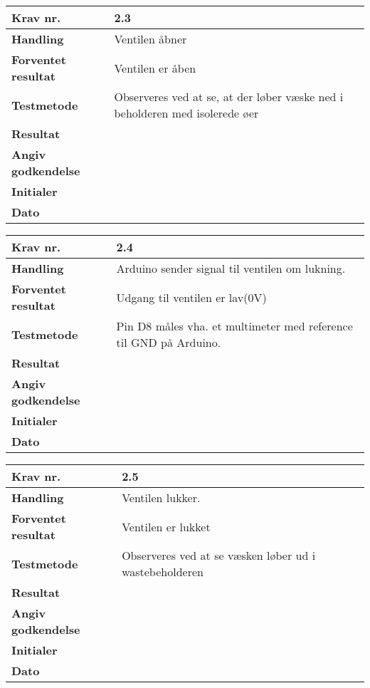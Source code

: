 	\begin{center}
		\begin{longtable}{ | m{4cm}| m{8.5cm}|} 
			\hline
			\textbf{Krav nr.} & 2.3  \\ 
			\hline
			\textbf{Handling} & Ventilen åbner   \\
			\hline
			\textbf{Forventet resultat} & Ventilen er åben \\
			\hline
			\textbf{Testmetode}  & Observeres ved at se, at der løber væske ned i beholderen med isolerede øer  \\
			\hline
			\textbf{Resultat}  &    \\
			\hline
			\textbf{Angiv godkendelse} &     \\
			\hline
			\textbf{Initialer} &     \\
			\hline
			\textbf{Dato} &    \\
			\hline
		\end{longtable}
	\end{center}
	
\newpage	
	
	\begin{center}
		\begin{longtable}{ | m{4cm}| m{8.5cm}|} 
			\hline
			\textbf{Krav nr.} & 2.4  \\ 
			\hline
			\textbf{Handling} & Arduino sender signal til ventilen om lukning.   \\
			\hline
			\textbf{Forventet resultat} & Udgang til ventilen er lav(0V) \\
			\hline
			\textbf{Testmetode}  & Pin D8 måles vha. et multimeter med reference til GND på Arduino.  \\
			\hline
			\textbf{Resultat}  &    \\
			\hline
			\textbf{Angiv godkendelse} &     \\
			\hline
			\textbf{Initialer} &     \\
			\hline
			\textbf{Dato} &    \\
			\hline
		\end{longtable}
	\end{center}	
	
	\begin{center}
		\begin{longtable}{ | m{4cm}| m{8.5cm}|} 
			\hline
			\textbf{Krav nr.} & 2.5  \\ 
			\hline
			\textbf{Handling} & Ventilen lukker. \\
			\hline
			\textbf{Forventet resultat} & Ventilen er lukket \\
			\hline
			\textbf{Testmetode}  & Observeres ved at se væsken løber ud i wastebeholderen  \\
			\hline
			\textbf{Resultat}  &    \\
			\hline
			\textbf{Angiv godkendelse} &     \\
			\hline
			\textbf{Initialer} &     \\
			\hline
			\textbf{Dato} &    \\
			\hline
		\end{longtable}
	\end{center}